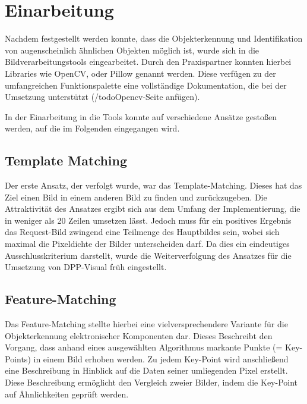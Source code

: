 \documentclass[
    type=Projektarbeit,
    status=draft, %
    language=german, %
    bibengine=bibtex,
]{unibwm-inf-thesis}
\begin{document}
    \section{Einarbeitung}
    Nachdem festgestellt werden konnte, dass die Objekterkennung und Identifikation von augenscheinlich ähnlichen Objekten möglich ist, wurde sich in die Bildverarbeitungstools eingearbeitet.
    Durch den Praxispartner konnten hierbei Libraries wie OpenCV, oder Pillow genannt werden.
    Diese verfügen zu der umfangreichen Funktionspalette eine vollständige Dokumentation, die bei der Umsetzung unterstützt (/todo{Opencv-Seite anfügen}).

    In der Einarbeitung in die Tools konnte auf verschiedene Ansätze gestoßen werden, auf die im Folgenden eingegangen wird.
    \subsection{Template Matching}
    Der erste Ansatz, der verfolgt wurde, war das Template-Matching.
    Dieses hat das Ziel einen Bild in einem anderen Bild zu finden und zurückzugeben.\cite{CV2TemplateMatching2022}
    Die Attraktivität des Ansatzes ergibt sich aus dem Umfang der Implementierung, die in weniger als 20 Zeilen umsetzen lässt.
    Jedoch muss für ein positives Ergebnis das Request-Bild zwingend eine Teilmenge des Hauptbildes sein, wobei sich maximal die Pixeldichte der Bilder unterscheiden darf.
    Da dies ein eindeutiges Ausschlusskriterium darstellt, wurde die Weiterverfolgung des Ansatzes für die Umsetzung von DPP-Visual früh eingestellt.

    \subsection{Feature-Matching}
    Das Feature-Matching stellte hierbei eine vielversprechendere Variante für die Objekterkennung elektronischer Komponenten dar.
    Dieses Beschreibt den Vorgang, dass anhand eines ausgewählten Algorithmus markante Punkte (= Key-Points) in einem Bild erhoben werden.
    Zu jedem Key-Point wird anschließend eine Beschreibung in Hinblick auf die Daten seiner umliegenden Pixel erstellt.
    Diese Beschreibung ermöglicht den Vergleich zweier Bilder, indem die Key-Point auf Ähnlichkeiten geprüft werden.\cite{CV2FeatureMathing2022}
\end{document}

